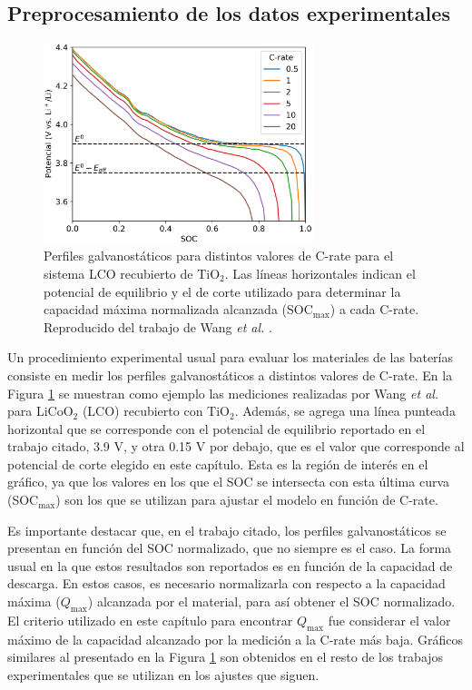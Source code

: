 \subsection{Preprocesamiento de los datos experimentales}

\begin{figure}[t]
    \centering
    \includegraphics[width=0.7\textwidth]{FastCharging/un/resultados/preprocesamiento/preprocesamiento.png}
    \caption{Perfiles galvanostáticos para distintos valores de C-rate para el
    sistema LCO recubierto de TiO$_2$. Las líneas horizontales indican el 
    potencial de equilibrio y el de corte utilizado para determinar la 
    capacidad máxima normalizada alcanzada (SOC$_{\max}$) a cada C-rate. 
    Reproducido del trabajo de Wang \textit{et al.} \cite{wang2019high}.}
    \label{fig:preproc}
\end{figure}
Un procedimiento experimental usual para evaluar los materiales de las baterías
consiste en medir los perfiles galvanostáticos a distintos valores de C-rate.
En la Figura \ref{fig:preproc} se muestran como ejemplo las mediciones realizadas
por Wang \textit{et al.} \cite{wang2019high} para LiCoO$_2$ (LCO) recubierto con 
TiO$_2$. Además, se agrega una línea punteada horizontal que se corresponde
con el potencial de equilibrio reportado en el trabajo citado, 3.9 V, y otra
0.15 V por debajo, que es el valor que corresponde al potencial de corte
elegido en este capítulo. Esta es la región de interés en el gráfico, ya que 
los valores en los que el SOC se intersecta con esta última curva (SOC$_{\max}$)
son los que se utilizan para ajustar el modelo en función de C-rate.

Es importante destacar que, en el trabajo citado, los perfiles galvanostáticos
se presentan en función del SOC normalizado, que no siempre es el caso. La 
forma usual en la que estos resultados son reportados es en función de la 
capacidad de descarga. En estos casos, es necesario normalizarla con respecto
a la capacidad máxima ($Q_{\max}$) alcanzada por el material, para así obtener
el SOC normalizado. El criterio utilizado en este capítulo para encontrar 
$Q_{\max}$ fue considerar el valor máximo de la capacidad alcanzado por la 
medición a la C-rate más baja. Gráficos similares al presentado en la Figura 
\ref{fig:preproc} son obtenidos en el resto de los trabajos experimentales que
se utilizan en los ajustes que siguen.

